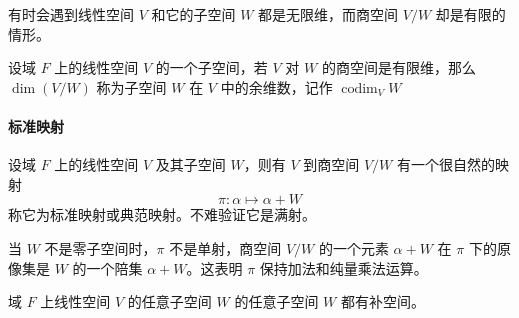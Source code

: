 有时会遇到线性空间 $V$ 和它的子空间 $W$ 都是无限维，而商空间 $V/W$ 却是有限的情形。

\begin{definition}[余维数]
	设域 $F$ 上的线性空间 $V$ 的一个子空间，若 $V$ 对 $W$ 的商空间是有限维，那么 $\dim(V/W)$ 称为子空间 $W$ 在 $V$ 中的余维数，记作 $\operatorname{codim}_V W$
\end{definition}

\paragraph{标准映射}

设域 $F$ 上的线性空间 $V$ 及其子空间 $W$，则有 $V$ 到商空间 $V/W$ 有一个很自然的映射
\[ \pi : \alpha \mapsto \alpha + W \]
称它为标准映射或典范映射。不难验证它是满射。

当 $W$ 不是零子空间时，$\pi$ 不是单射，商空间 $V/W$ 的一个元素 $\alpha + W$ 在 $\pi$ 下的原像集是 $W$ 的一个陪集 $\alpha + W$。这表明 $\pi$ 保持加法和纯量乘法运算。

\begin{theorem}
	域 $F$ 上线性空间 $V$ 的任意子空间 $W$ 的任意子空间 $W$ 都有补空间。
\end{theorem}


